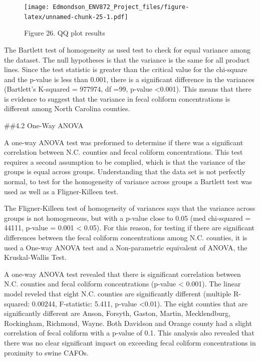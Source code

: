\documentclass[12pt,]{article}
\begin{document}
\begin{figure}
\centering
\texttt{[image: Edmondson\_ENV872\_Project\_files/figure-latex/unnamed-chunk-25-1.pdf]}
\caption{Figure 26. QQ plot results}
\end{figure}

The Bartlett test of homogeneity as used test to check for equal
variance among the dataset. The null hypotheses is that the variance is
the same for all product lines. Since the test statistic is greater than
the critical value for the chi-square and the p-value is less than
0.001, there is a significant difference in the variances (Bartlett's
K-squared = 977974, df =99, p-value \textless{}0.001). This means that
there is evidence to suggest that the variance in fecal coliform
concentrations is different among North Carolina counties. \newpage

\#\#4.2 One-Way ANOVA

A one-way ANOVA test was preformed to determine if there was a
significant correlation between N.C. counties and fecal coliform
concentrations. This test requires a second assumption to be complied,
which is that the variance of the groups is equal across groups.
Understanding that the data set is not perfectly normal, to test for the
homogeneity of variance across groups a Bartlett test was used as well
as a Fligner-Killeen test.

The Fligner-Killeen test of homogeneity of variances says that the
variance across groups is not homogeneous, but with a p-value close to
0.05 (med chi-squared = 44111, p-value = 0.001 \textless{} 0.05). For
this reason, for testing if there are significant differences between
the fecal coliform concentrations among N.C. counties, it is used a
One-way ANOVA test and a Non-parametric equivalent of ANOVA, the
Kruskal-Wallis Test.

A one-way ANOVA test revealed that there is significant correlation
between N.C. counties and fecal coliform concentrations (p-value
\textless{} 0.001). The linear model reveled that eight N.C. counties
are significantly different (multiple R-squared: 0.00244, F-statistic:
5.411, p-value \textless{}0.01). The eight counties that are
significantly different are Anson, Forsyth, Gaston, Martin,
Mecklendburg, Rockingham, Richmond, Wayne. Both Davidson and Orange
county had a slight correlation of fecal coliform with a p-value of 0.1.
This analysis also revealed that there was no clear significant impact
on exceeding fecal coliform concentrations in proximity to swine CAFOs.
\newpage
\end{document}
